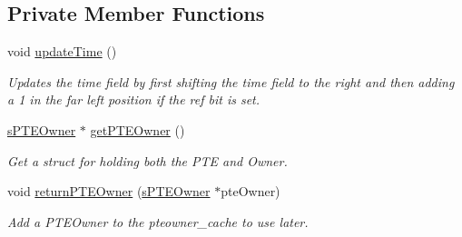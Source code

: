 \subsection*{\-Private \-Member \-Functions}
\begin{DoxyCompactItemize}
\item 
void \hyperlink{classcPRLruApprox_a72c71139928164b0c300c3c2b0bb89f9}{update\-Time} ()
\begin{DoxyCompactList}\small\item\em \-Updates the time field by first shifting the time field to the right and then adding a 1 in the far left position if the ref bit is set. \end{DoxyCompactList}\item 
\hyperlink{structsPTEOwner}{s\-P\-T\-E\-Owner} $\ast$ \hyperlink{classcPRLruApprox_aa3b208b716158d929a314a1362e1b9e4}{get\-P\-T\-E\-Owner} ()
\begin{DoxyCompactList}\small\item\em \-Get a struct for holding both the \-P\-T\-E and \-Owner. \end{DoxyCompactList}\item 
\hypertarget{classcPRLruApprox_a9df7f4858418f4e8d61e38d56ec66d9d}{void \hyperlink{classcPRLruApprox_a9df7f4858418f4e8d61e38d56ec66d9d}{return\-P\-T\-E\-Owner} (\hyperlink{structsPTEOwner}{s\-P\-T\-E\-Owner} $\ast$pte\-Owner)}\label{d1/d58/classcPRLruApprox_a9df7f4858418f4e8d61e38d56ec66d9d}

\begin{DoxyCompactList}\small\item\em \-Add a \-P\-T\-E\-Owner to the pteowner\-\_\-cache to use later. \end{DoxyCompactList}\end{DoxyCompactItemize}
